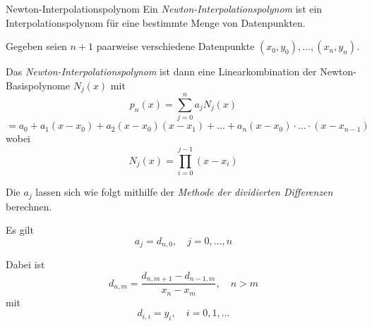 \begin{defi}{Newton-Interpolationspolynom}
    Ein \emph{Newton-Interpolationspolynom} ist ein Interpolationspolynom für eine bestimmte Menge von Datenpunkten.
    
    Gegeben seien $n+1$ paarweise verschiedene Datenpunkte $(x_0, y_0), \ldots, (x_n, y_n)$.
    
    Das \emph{Newton-Interpolationspolynom} ist dann eine Linearkombination der Newton-Basispolynome $N_j(x)$ mit 
    \[ 
        p_n(x) = \sum_{j=0}^{n} a_j N_j(x)  
    \]
    \[  
        = a_0 + a_1 (x - x_0) + a_2 (x - x_0) (x - x_1) + \ldots + a_n (x - x_0) \cdot \ldots \cdot (x - x_{n-1})
    \]
    wobei 
    \[
        N_j (x) = \prod_{i=0}^{j-1} \left( x - x_i \right)
    \]
    
    Die $a_j$ lassen sich wie folgt mithilfe der \emph{Methode der dividierten Differenzen} berechnen.
    
    Es gilt 
    \[ 
        a_j = d_{n, 0}, \quad j = 0, \ldots, n
    \]
    
    Dabei ist 
    \[ 
        d_{n, m} = \frac{d_{n, m+1} - d_{n-1, m}}{x_n - x_m}, \quad n > m
    \]
    mit 
    \[
        d_{i,i} = y_i, \quad i = 0, 1, \ldots    
    \]
    

\end{defi}
